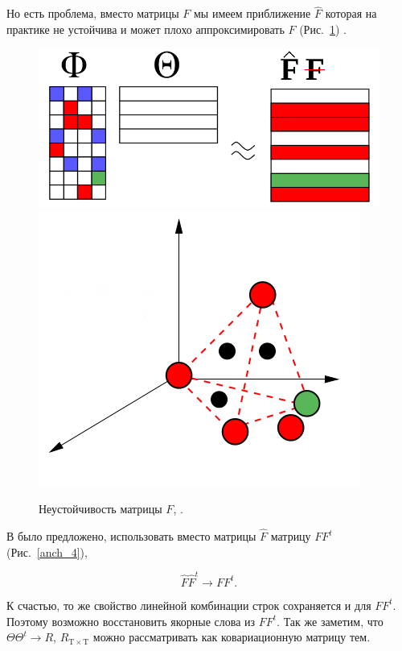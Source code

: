 \documentclass[a4paper, 14pt]{extarticle}
\begin{document}
Но есть проблема, вместо матрицы $F$ мы имеем приближение $\hat{F}$ которая на практике не устойчива и может плохо аппроксимировать $F$ (Рис.~\ref{anch_3}) \cite{Arora12}. 
\begin{figure}[h]
		\centering \includegraphics[scale=0.5]{img/anch_3} 
		\centering \includegraphics[scale=0.5]{img/anch_4}
		\caption{Неустойчивость матрицы $F$, \cite{AnkurMoitraSlides}.}
		\label{anch_3}
\end{figure}

В \cite{Arora12} было предложено, использовать вместо матрицы $\hat{F}$ матрицу $FF^t$ (Рис.~\ref{anch_4}), 

\begin{equation}
	\hat{F}\hat{F}^t \rightarrow FF^t.
\end{equation}


К счастью, то же свойство линейной комбинации строк сохраняется и для $FF^t$. Поэтому возможно восстановить якорные слова из $FF^t$. Так же заметим, что $\Theta \Theta^t \rightarrow R$, $R_{\mathrm{T} \times \mathrm{T}}$ можно рассматривать как ковариационную матрицу тем. 
\end{document}
